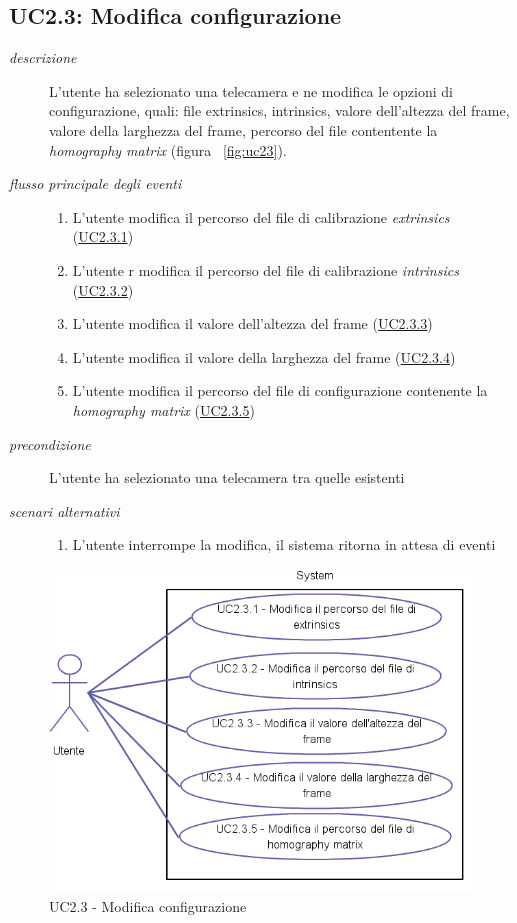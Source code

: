 \subsection{UC2.3: Modifica configurazione} \label{sec:UC2.3}
\begin{description}
\item[\em{descrizione }]L'utente ha selezionato una telecamera e ne modifica le opzioni di configurazione, quali: file extrinsics, intrinsics, valore dell'altezza del frame, valore della larghezza del frame, percorso del file contentente la \textit{homography matrix} (figura ~\ref{fig:uc23}).
\item[\em{flusso principale degli eventi }] \mbox{}
\begin{enumerate}
\item L'utente modifica il percorso del file di calibrazione \textit{extrinsics} (\hyperref[sec:uc2.3.1]{UC2.3.1})
\item L'utente r modifica il percorso del file di calibrazione \textit{intrinsics} (\hyperref[sec:uc2.3.2]{UC2.3.2})
\item L'utente modifica il valore dell'altezza del frame (\hyperref[sec:uc2.3.3]{UC2.3.3})
\item L'utente modifica il valore della larghezza del frame (\hyperref[sec:uc2.3.4]{UC2.3.4})
\item L'utente modifica il percorso del file di configurazione contenente la \textit{homography matrix} (\hyperref[sec:uc2.3.5]{UC2.3.5})
\end{enumerate}
\item[\em{precondizione }] L'utente ha selezionato una telecamera tra quelle esistenti
\item[\em{scenari alternativi }] \mbox{} 
\begin{enumerate} 
\item L'utente interrompe la modifica, il sistema ritorna in attesa di eventi
\end{enumerate}
\end{description}

\begin{figure}[htpb] 
\centering 
\includegraphics[scale=0.4]{./images/uc23.png} 
\caption{UC2.3 - Modifica configurazione} 
\label{fig:UC2.3}
\end{figure} 


